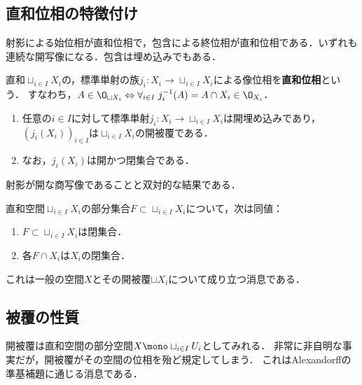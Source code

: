 \documentclass[uplatex,dvipdfmx]{jsreport}
\begin{document}
\subsection{直和位相の特徴付け}

\begin{tcolorbox}[colframe=ForestGreen, colback=ForestGreen!10!white,breakable,colbacktitle=ForestGreen!40!white,coltitle=black,fonttitle=\bfseries\sffamily,
title=]
    射影による始位相が直和位相で，包含による終位相が直和位相である．いずれも連続な開写像になる．包含は埋め込みでもある．
\end{tcolorbox}

\begin{definition}
    直和$\sqcup_{i\in I}X_i$の，標準単射の族$j_i:X_i\to\sqcup_{i\in I}X_i$による像位相を\textbf{直和位相}という．
    すなわち，$A\in\O_{\sqcup X_i}\Leftrightarrow\forall_{i\in I}\;j_i^{-1}(A)=A\cap X_i\in\O_{X_i}$．
\end{definition}

\begin{proposition}[標準単射は開埋め込み]\mbox{}
    \begin{enumerate}
        \item 任意の$i\in I$に対して標準単射$j_i:X_i\to\sqcup_{i\in I}X_i$は開埋め込みであり，$(j_i(X_i))_{i\in I}$は$\sqcup_{i\in I}X_i$の開被覆である．
        \item なお，$j_i(X_i)$は開かつ閉集合である．
    \end{enumerate}
    射影が開な商写像であることと双対的な結果である．
\end{proposition}

\begin{proposition}[閉集合の特徴付け]
    直和空間$\sqcup_{i\in I}X_i$の部分集合$F\subset\sqcup_{i\in I}X_i$について，次は同値：
    \begin{enumerate}
        \item $F\subset\sqcup_{i\in I}X_i$は閉集合．
        \item 各$F\cap X_i$は$X_i$の閉集合．
    \end{enumerate}
    これは一般の空間$X$とその開被覆$\sqcup X_i$について成り立つ消息である．
\end{proposition}

\subsection{被覆の性質}

\begin{tcolorbox}[colframe=ForestGreen, colback=ForestGreen!10!white,breakable,colbacktitle=ForestGreen!40!white,coltitle=black,fonttitle=\bfseries\sffamily,
title=]
    開被覆は直和空間の部分空間$X\mono\sqcup_{i\in I}U_i$としてみれる．
    非常に非自明な事実だが，開被覆がその空間の位相を殆ど規定してしまう．
    これはAlexandorffの準基補題に通じる消息である．
\end{tcolorbox}
\end{document}
